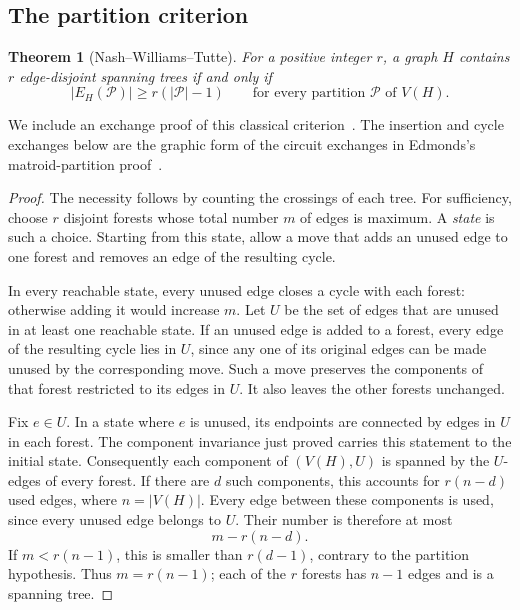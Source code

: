 \documentclass[11pt]{amsart}
\newtheorem{theorem}{Theorem}[section]
\theoremstyle{definition}
\theoremstyle{remark}
\numberwithin{equation}{section}
\begin{document}
\subsection{The partition criterion}

\begin{theorem}[Nash--Williams--Tutte]\label{thm:packing}
For a positive integer \(r\), a graph \(H\) contains \(r\)
edge-disjoint spanning trees if and only if
\[
 |E_H(\mathcal P)|\ge r(|\mathcal P|-1)
 \qquad\text{for every partition }\mathcal P\text{ of }V(H).
\]
\end{theorem}

We include an exchange proof of this classical
criterion~\cite{NashWilliams,Tutte}.
The insertion and cycle exchanges below are the graphic form of
the circuit exchanges in Edmonds's matroid-partition
proof~\cite[Section~1.6]{Edmonds1965}.

\begin{proof}
The necessity follows by counting the crossings of each tree.
For sufficiency, choose \(r\) disjoint forests whose total number
\(m\) of edges is maximum. A \emph{state} is such a choice.
Starting from this state, allow a move that adds an unused edge to
one forest and removes an edge of the resulting cycle.

In every reachable state, every unused edge closes a cycle with
each forest: otherwise adding it would increase \(m\).
Let \(U\) be the set of edges that are unused in at least one reachable
state. If an unused edge is added to a forest, every edge of the
resulting cycle lies in \(U\), since any one of its original edges
can be made unused by the corresponding move.
Such a move preserves the components of that forest restricted to
its edges in \(U\). It also leaves the other forests unchanged.

Fix \(e\in U\). In a state where \(e\) is unused, its endpoints are
connected by edges in \(U\) in each forest. The component invariance
just proved carries this statement to the initial state.
Consequently each component of \((V(H),U)\) is spanned by the
\(U\)-edges of every forest.
If there are \(d\) such components, this accounts for \(r(n-d)\)
used edges, where \(n=|V(H)|\).
Every edge between these components is used, since every unused
edge belongs to \(U\). Their number is therefore at most
\[
 m-r(n-d).
\]
If \(m<r(n-1)\), this is smaller than \(r(d-1)\), contrary to the
partition hypothesis. Thus \(m=r(n-1)\); each of the \(r\) forests
has \(n-1\) edges and is a spanning tree.
\end{proof}
\end{document}
